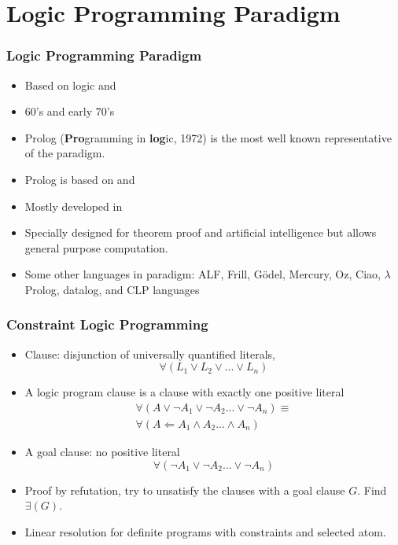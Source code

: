 \section{Logic Programming Paradigm}
\begin{frame}
\frametitle{Logic Programming Paradigm}
\begin{itemize}
\item Based on logic and 
\item 60's and early 70's 
\item Prolog (\textbf{Pro}gramming in \textbf{log}ic, 1972) is
	the most well known representative of the paradigm.
\item Prolog is based on  and 
\item Mostly developed in 
\item Specially designed for theorem proof and artificial intelligence but
	allows general purpose computation.
\item Some other languages in paradigm: ALF, Frill, Gödel, Mercury, Oz,
Ciao, $\lambda$Prolog, datalog, and CLP languages
\end{itemize}
\end{frame}

\begin{frame}
\frametitle{Constraint Logic Programming}
\begin{itemize}
\item
Clause: disjunction of universally quantified literals,
\[ \forall(L_1 \vee L_2 \vee ... \vee L_n) \]
\item
A logic program clause is a clause with exactly one
positive literal
\[ \begin{array}{l}
   \forall(A \vee \neg A_1 \vee \neg A_2 ... \vee \neg A_n) \equiv \\
   \forall(A \Leftarrow A_1 \wedge A_2 ... \wedge  A_n) 
\end{array}\] 

\item
A goal clause: no positive literal
\[ \forall(\neg A_1 \vee \neg A_2 ... \vee \neg A_n) \]

\item
Proof by refutation, try to unsatisfy the clauses with
a goal clause $G$. Find $\exists(G)$.
\item
Linear resolution for definite programs with constraints and
selected atom.
\end{itemize}
\end{frame}

